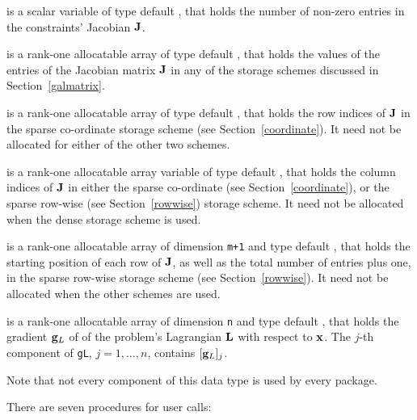 \documentclass{galahad}
\begin{document}
\begin{description}
 is a scalar variable of type default \integer, 
that holds the number of non-zero entries in the 
constraints' Jacobian ${\mathbf{J}}$.

 is a rank-one allocatable array of type default \realdp, that holds
the values of the entries of the Jacobian matrix ${\mathbf{J}}$ in any of the 
storage schemes discussed in Section~\ref{galmatrix}.

 is a rank-one allocatable array of type default \integer,
that holds the row indices of ${\mathbf{J}}$ in the sparse co-ordinate storage
scheme (see Section~\ref{coordinate}). 
It need not be allocated for either of the other two schemes.

 is a rank-one allocatable array variable of type default \integer,
that holds the column indices of ${\mathbf{J}}$ in either the sparse co-ordinate 
(see Section~\ref{coordinate}), or the sparse row-wise 
(see Section~\ref{rowwise}) storage scheme.
It need not be allocated when the dense storage scheme is used.

 is a rank-one allocatable array of dimension {\tt m+1} and type 
default \integer, that holds the 
starting position of each row of ${\mathbf{J}}$, as well
as the total number of entries plus one, in the sparse row-wise storage
scheme (see Section~\ref{rowwise}). It need not be allocated when the
other schemes are used.

 is a rank-one allocatable array of dimension {\tt n} and type 
default \realdp, that holds the gradient ${\mathbf{g}}_L$ 
of of the problem's Lagrangian ${\mathbf{L}}$ with respect to ${\mathbf{x}}$.
The $j$-th component of 
{\tt gL}, $j = 1,  \ldots ,  n$, contains $[{\mathbf{g}}_L]_{j}$.

\end{description}

\noindent
Note that not every component of this data type is used by every package.


\galarguments
There are seven procedures for user calls:
\end{document}
